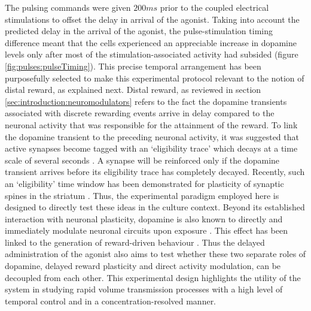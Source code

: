 The pulsing commands were given \(200ms\) prior to the coupled electrical stimulations to offset the delay in arrival of the agonist. Taking into account the predicted delay in the arrival of the agonist, the pulse-stimulation timing difference meant that the cells experienced an appreciable increase in dopamine levels only after most of the stimulation-associated activity had subsided (figure \ref{fig:pulses:pulseTiming}). This precise temporal arrangement has been purposefully selected to make this experimental protocol relevant to the notion of distal reward, as explained next. Distal reward, as reviewed in section \ref{sec:introduction:neuromodulators} refers to the fact the dopamine transients associated with discrete rewarding events arrive in delay compared to the neuronal activity that was responsible for the attainment of the reward. To link the dopamine transient to the preceding neuronal activity, it was suggested that active synapses become tagged with an `eligibility trace' which decays at a time scale of several seconds \cite{izhikevich2007solving}. A synapse will be reinforced only if the dopamine transient arrives before its eligibility trace has completely decayed. Recently, such an `eligibility' time window has been demonstrated for plasticity of synaptic spines in the striatum \cite{yagishita2014critical}. Thus, the experimental paradigm employed here is designed to directly test these ideas in the culture context. Beyond its established interaction with neuronal plasticity, dopamine is also known to directly and immediately modulate neuronal circuits upon exposure \cite{gorelova2002mechanisms,ferron1984inhibitory,rodgers2011tonic,gonzalez2001dopamine,tye2013dopamine}. This effect has been linked to the generation of reward-driven behaviour \cite{bromberg2010dopamine,tye2013dopamine}. Thus the delayed administration of the agonist also aims to test whether these two separate roles of dopamine, delayed reward plasticity and direct activity modulation, can be decoupled from each other. This experimental design highlights the utility of the system in studying rapid volume transmission processes with a high level of temporal control and in a concentration-resolved manner.

